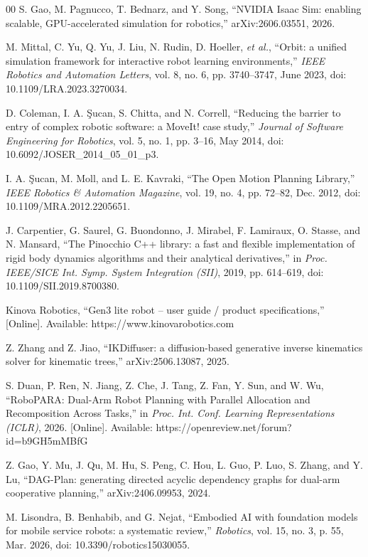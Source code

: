 \documentclass[conference]{IEEEtran}
\begin{document}
\begin{thebibliography}{00}
S. Gao, M. Pagnucco, T. Bednarz, and Y. Song, ``NVIDIA Isaac Sim: enabling scalable, GPU-accelerated simulation for robotics,'' arXiv:2606.03551, 2026.

M. Mittal, C. Yu, Q. Yu, J. Liu, N. Rudin, D. Hoeller, \textit{et al.}, ``Orbit: a unified simulation framework for interactive robot learning environments,'' \textit{IEEE Robotics and Automation Letters}, vol. 8, no. 6, pp. 3740--3747, June 2023, doi: 10.1109/LRA.2023.3270034.

D. Coleman, I. A. {\c{S}}ucan, S. Chitta, and N. Correll, ``Reducing the barrier to entry of complex robotic software: a MoveIt! case study,'' \textit{Journal of Software Engineering for Robotics}, vol. 5, no. 1, pp. 3--16, May 2014, doi: 10.6092/JOSER\_2014\_05\_01\_p3.

I. A. {\c{S}}ucan, M. Moll, and L. E. Kavraki, ``The Open Motion Planning Library,'' \textit{IEEE Robotics \& Automation Magazine}, vol. 19, no. 4, pp. 72--82, Dec. 2012, doi: 10.1109/MRA.2012.2205651.

J. Carpentier, G. Saurel, G. Buondonno, J. Mirabel, F. Lamiraux, O. Stasse, and N. Mansard, ``The Pinocchio C++ library: a fast and flexible implementation of rigid body dynamics algorithms and their analytical derivatives,'' in \textit{Proc. IEEE/SICE Int. Symp. System Integration (SII)}, 2019, pp. 614--619, doi: 10.1109/SII.2019.8700380.

Kinova Robotics, ``Gen3 lite robot -- user guide / product specifications,'' [Online]. Available: https://www.kinovarobotics.com

Z. Zhang and Z. Jiao, ``IKDiffuser: a diffusion-based generative inverse kinematics solver for kinematic trees,'' arXiv:2506.13087, 2025.

S. Duan, P. Ren, N. Jiang, Z. Che, J. Tang, Z. Fan, Y. Sun, and W. Wu, ``RoboPARA: Dual-Arm Robot Planning with Parallel Allocation and Recomposition Across Tasks,'' in \textit{Proc. Int. Conf. Learning Representations (ICLR)}, 2026. [Online]. Available: https://openreview.net/forum?id=b9GH5mMBfG

Z. Gao, Y. Mu, J. Qu, M. Hu, S. Peng, C. Hou, L. Guo, P. Luo, S. Zhang, and Y. Lu, ``DAG-Plan: generating directed acyclic dependency graphs for dual-arm cooperative planning,'' arXiv:2406.09953, 2024.

M. Lisondra, B. Benhabib, and G. Nejat, ``Embodied AI with foundation models for mobile service robots: a systematic review,'' \textit{Robotics}, vol. 15, no. 3, p. 55, Mar. 2026, doi: 10.3390/robotics15030055.


\end{thebibliography}
\end{document}
